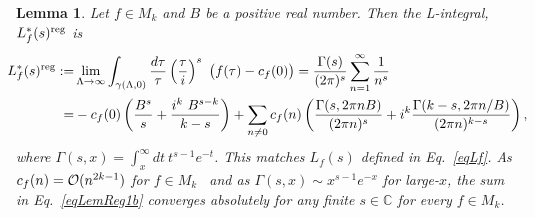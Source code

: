 \documentclass[11pt,a4paper]{article}
\newcommand{\g}{\gamma}
\newcommand{\G}{\Gamma}
\newtheorem{lem}[thm]{Lemma}
\def\C{\mathbb{C}}
\newcommand{\reg}{{\rm reg}}
\begin{document}
\begin{lem}\label{LemReg1}
Let $f \in M_k$ and $B$ be a positive real number. Then the L-integral, $L_f^*(s)^{\reg}$ is
\begin{align}
\!\!\!\!L^*_f(s)^\reg:=&\lim_{\Lambda \to \infty} \int_{\g\left(\Lambda,0\right)} \frac{d\tau}{\tau} 
\left( \frac{\tau}{i}\right)^s 
~\big(f(\tau)-c_f(0)\big) 
= \frac{\G(s)}{(2\pi)^s} \sum_{n =1}^{\infty} \frac{1}{n^s} \label{eqLemReg1a} \\
=&-c_f(0)\left( \frac{B^s}{s} + \frac{i^k~B^{s-k}}{k-s} \right) + \sum_{n \neq 0} c_f(n) \left( \frac{\G(s,2\pi n B)}{(2\pi n)^s} + i^k \frac{\G(k-s,2\pi n/B)}{(2\pi n)^{k-s}} \right),\!\!\!\!
\label{eqLemReg1b}
\end{align}
where $\G(s,x) = \int_x^{\infty} dt~ t^{s-1} e^{-t} $. This matches $L_f(s)$ defined in Eq.~\eqref{eqLf}. As $c_f(n) = {\cal O}(n^{2k-1})$ for $f \in M_k$~\cite{01-Apostol} and as $\G(s,x) \sim x^{s-1} e^{-x}$ for large-$x$, the sum in Eq.~\eqref{eqLemReg1b} converges absolutely for any finite $s \in \C$ for every $f \in M_k$. 
\end{lem}
\end{document}
